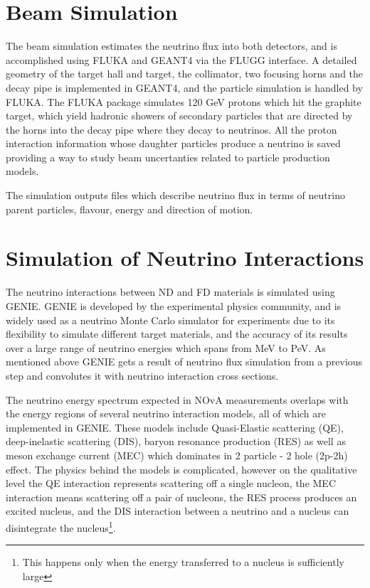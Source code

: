 \section{Beam Simulation}
The beam simulation estimates the neutrino flux into both detectors, and is accomplished using FLUKA and
GEANT4 via the FLUGG interface. A detailed geometry of the target hall and target, the collimator, two
focusing horns and the decay pipe is implemented in GEANT4, and the particle simulation is handled by
FLUKA. The FLUKA package simulates 120 GeV protons which hit the graphite target, which yield hadronic 
showers of secondary particles that are directed by the horns into the decay pipe where they decay to 
neutrinos. All the proton interaction information whose daughter particles produce a
neutrino is saved providing a way to study beam uncertanties related to particle production models. 

The simulation outputs files which describe neutrino flux in terms of neutrino parent particles, 
flavour, energy and direction of motion.

\section{Simulation of Neutrino Interactions}
The neutrino interactions between ND and FD materials is simulated using GENIE. GENIE is developed
by the experimental physics community, and is widely used as a neutrino Monte Carlo simulator for experiments due
to its flexibility to simulate different target materials, and the accuracy of its results over a large
range of neutrino energies which spans from MeV to PeV. As mentioned above GENIE gets a result of neutrino 
flux simulation from a previous step and convolutes it with neutrino interaction cross sections.

The neutrino energy spectrum expected in NOvA measurements overlaps
with the energy regions of several neutrino interaction models, all of which are implemented in GENIE.
These models include Quasi-Elastic scattering (QE), deep-inelastic scattering (DIS), baryon resonance
production (RES) as well as meson exchange current (MEC) which dominates in 2 particle - 2 hole (2p-2h) 
effect. The physics behind the models is complicated, however on the qualitative level the QE interaction 
represents scattering off a single nucleon, the MEC interaction means scattering off a pair of nucleons, 
the RES process produces an excited nucleus, and the DIS interaction between a neutrino and a nucleus can 
disintegrate the nucleus\footnote{This happens only when the energy transferred to a nucleus is 
sufficiently large}.


